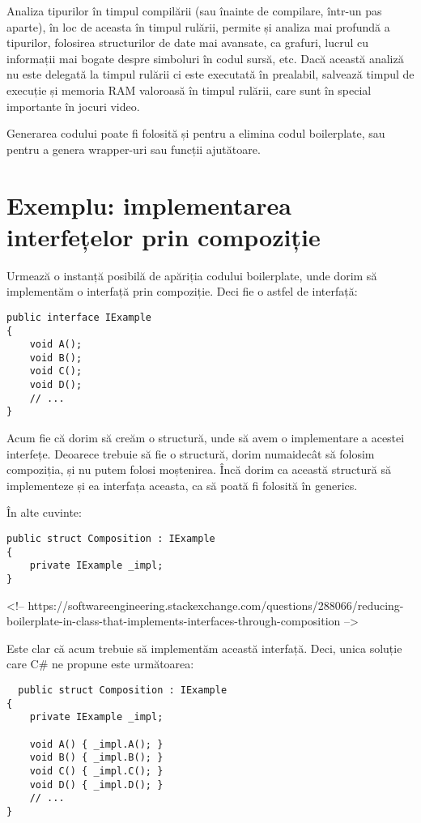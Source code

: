\documentclass{report}
\begin{document}
Analiza tipurilor în timpul compilării (sau înainte de compilare, într-un pas aparte), în loc de aceasta în timpul rulării, permite și analiza mai profundă a tipurilor, folosirea structurilor de date mai avansate, ca grafuri, lucrul cu informații mai bogate despre simboluri în codul sursă, etc.
Dacă această analiză nu este delegată la timpul rulării ci este executată în prealabil, salvează timpul de execuție și memoria RAM valoroasă în timpul rulării, care sunt în special importante în jocuri video.

Generarea codului poate fi folosită și pentru a elimina codul boilerplate, sau pentru a genera wrapper-uri sau funcții ajutătoare.

\section{Exemplu: implementarea interfețelor prin compoziție}

Urmează o instanță posibilă de apăriția codului boilerplate, unde dorim să implementăm o interfață prin compoziție.
Deci fie o astfel de interfață:

\begin{lstlisting}
public interface IExample
{
    void A();
    void B();
    void C();
    void D();
    // ...
}
\end{lstlisting}

Acum fie că dorim să creăm o structură, unde să avem o implementare a acestei interfețe.
Deoarece trebuie să fie o structură, dorim numaidecât să folosim compoziția, și nu putem folosi moștenirea.
Încă dorim ca această structură să implementeze și ea interfața aceasta, ca să poată fi folosită în generics.

În alte cuvinte:

\begin{lstlisting}
public struct Composition : IExample
{
    private IExample _impl;
}
\end{lstlisting}

<!-- https://softwareengineering.stackexchange.com/questions/288066/reducing-boilerplate-in-class-that-implements-interfaces-through-composition -->

Este clar că acum trebuie să implementăm această interfață.
Deci, unica soluție care C# ne propune este următoarea:

\begin{lstlisting}
  public struct Composition : IExample
{
    private IExample _impl;

    void A() { _impl.A(); }
    void B() { _impl.B(); }
    void C() { _impl.C(); }
    void D() { _impl.D(); }
    // ...
}
\end{lstlisting}
\end{document}
